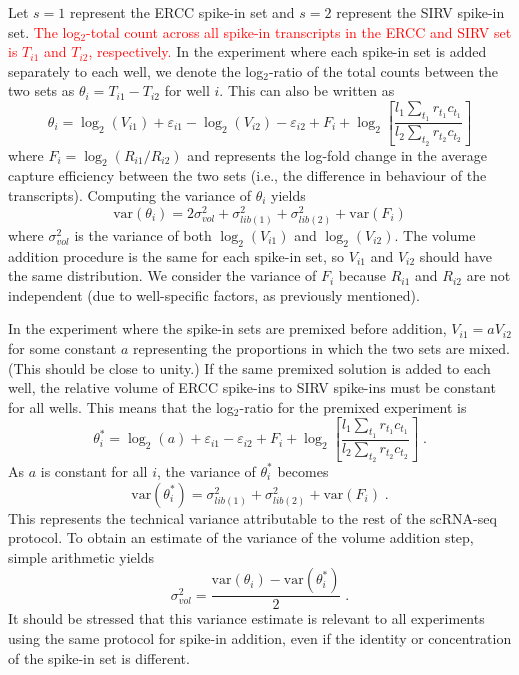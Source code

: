 \documentclass{article}
\newcommand{\revised}[1]{\textcolor{red}{#1}}
\newcommand\variance{\mbox{var}}
\begin{document}
Let $s=1$ represent the ERCC spike-in set and $s=2$ represent the SIRV spike-in set.
\revised{The log$_2$-total count across all spike-in transcripts in the ERCC and SIRV set is $T_{i1}$ and $T_{i2}$, respectively.}
In the experiment where each spike-in set is added separately to each well, we denote the log$_2$-ratio of the total counts between the two sets as $\theta_i = T_{i1} - T_{i2}$ for well $i$.
This can also be written as
\[
    \theta_i = \log_2(V_{i1}) + \varepsilon_{i1} - \log_2(V_{i2}) - \varepsilon_{i2} + F_i + \log_2\left[ \frac{l_1 \sum_{t_1} r_{t_1} c_{t_1}}{l_2\sum_{t_2} r_{t_2} c_{t_2}} \right]
\]
where $F_i = \log_2(R_{i1}/R_{i2})$ and represents the log-fold change in the average capture efficiency between the two sets (i.e., the difference in behaviour of the transcripts).
Computing the variance of $\theta_i$ yields
\[
\variance(\theta_i) = 2 \sigma^2_{vol} + \sigma^2_{lib(1)} + \sigma^2_{lib(2)} + \variance(F_i)
\]
where $\sigma^2_{vol}$ is the variance of both $\log_2(V_{i1})$ and $\log_2(V_{i2})$.
The volume addition procedure is the same for each spike-in set, so $V_{i1}$ and $V_{i2}$ should have the same distribution.
We consider the variance of $F_i$ because $R_{i1}$ and $R_{i2}$ are not independent (due to well-specific factors, as previously mentioned).

In the experiment where the spike-in sets are premixed before addition, $V_{i1}=aV_{i2}$ for some constant $a$ representing the proportions in which the two sets are mixed.
(This should be close to unity.)
If the same premixed solution is added to each well, the relative volume of ERCC spike-ins to SIRV spike-ins must be constant for all wells.
This means that the log$_2$-ratio for the premixed experiment is 
\[
    \theta^*_i = \log_2(a) + \varepsilon_{i1} - \varepsilon_{i2} + F_i + \log_2\left[ \frac{l_1 \sum_{t_1} r_{t_1} c_{t_1}}{l_2\sum_{t_2} r_{t_2} c_{t_2}} \right] \;.
\]
As $a$ is constant for all $i$, the variance of $\theta^*_i$ becomes
\[
\variance(\theta^*_i) = \sigma^2_{lib(1)} + \sigma^2_{lib(2)} + \variance(F_i) \;.
\]
This represents the technical variance attributable to the rest of the scRNA-seq protocol.
To obtain an estimate of the variance of the volume addition step, simple arithmetic yields
\[
\sigma^2_{vol} = \frac{\variance(\theta_i) - \variance(\theta^*_i)}{2} \;.
\]
It should be stressed that this variance estimate is relevant to all experiments using the same protocol for spike-in addition, even if the identity or concentration of the spike-in set is different.
\end{document}
